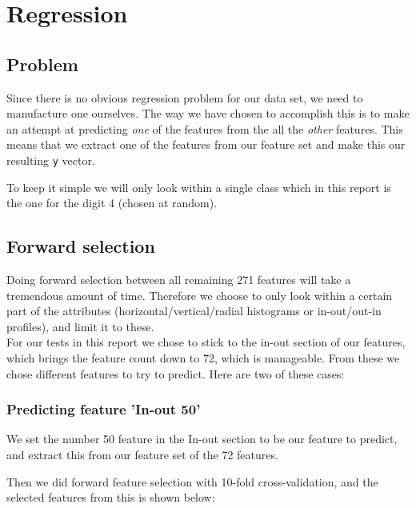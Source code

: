 \chapter{Regression}

\section{Problem}
Since there is no obvious regression problem for our data set, we need to manufacture one ourselves. The way we have chosen to accomplish this is to make an attempt at predicting \emph{one} of the features from the all the \emph{other} features. This means that we extract one of the features from our feature set and make this our resulting \texttt{y} vector.

To keep it simple we will only look within a single class which in this report is the one for the digit 4 (chosen at random).

\section{Forward selection}
Doing forward selection between all remaining 271 features will take a tremendous amount of time. Therefore we choose to only look within a certain part of the attributes (horizontal/vertical/radial histograms or in-out/out-in profiles), and limit it to these. \\

For our tests in this report we chose to stick to the in-out section of our features, which brings the feature count down to 72, which is manageable. From these we chose different features to try to predict. Here are two of these cases:

\subsection*{Predicting feature 'In-out 50'}

We set the number 50 feature in the In-out section to be our feature to predict, and extract this from our feature set of the 72 features. 

Then we did forward feature selection with 10-fold cross-validation, and the selected features from this is shown below:

